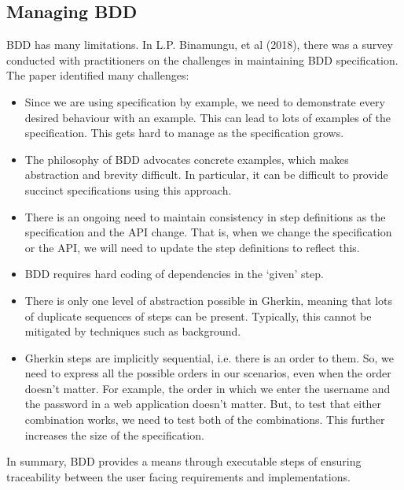 \documentclass[a4paper, openany]{memoir}
\begin{document}
\subsection{Managing BDD}
BDD has many limitations. In L.P. Binamungu, et al (2018), there was a survey conducted with practitioners on the challenges in maintaining BDD specification. The paper identified many challenges:
\begin{itemize}
    \item Since we are using specification by example, we need to demonstrate every desired behaviour with an example. This can lead to lots of examples of the specification. This gets hard to manage as the specification grows.
    \item The philosophy of BDD advocates concrete examples, which makes abstraction and brevity difficult. In particular, it can be difficult to provide succinct specifications using this approach.
    \item There is an ongoing need to maintain consistency in step definitions as the specification and the API change. That is, when we change the specification or the API, we will need to update the step definitions to reflect this.
    \item BDD requires hard coding of dependencies in the `given' step. 
    \item There is only one level of abstraction possible in Gherkin, meaning that lots of duplicate sequences of steps can be present. Typically, this cannot be mitigated by techniques such as background.
    \item Gherkin steps are implicitly sequential, i.e. there is an order to them. So, we need to express all the possible orders in our scenarios, even when the order doesn't matter. For example, the order in which we enter the username and the password in a web application doesn't matter. But, to test that either combination works, we need to test both of the combinations. This further increases the size of the specification.
\end{itemize}

In summary, BDD provides a means through executable steps of ensuring traceability between the user facing requirements and implementations.
\end{document}
